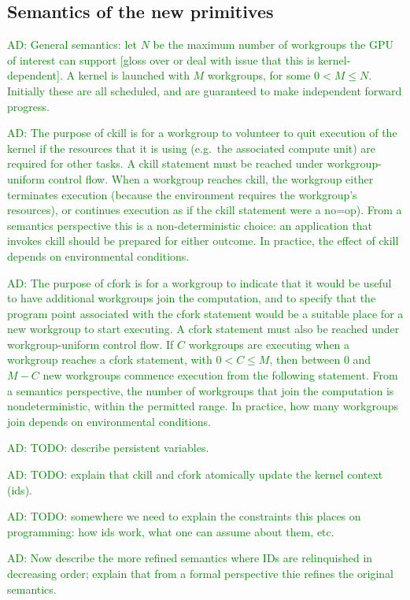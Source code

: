 \documentclass[nocopyrightspace]{sigplanconf-pldi16}
\newcommand{\ADComment}[1]{\textcolor{green}{AD: #1}}
\begin{document}
\subsection{Semantics of the new primitives}

\ADComment{General semantics: let $N$ be the maximum number of
  workgroups the GPU of interest can support [gloss over or deal with
    issue that this is kernel-dependent].  A kernel is launched with
  $M$ workgroups, for some $0 < M \leq N$.  Initially these are all
  scheduled, and are guaranteed to make independent forward progress.}

\ADComment{The purpose of ckill is for a workgroup to volunteer to
  quit execution of the kernel if the resources that it is using
  (e.g.\ the associated compute unit) are required for other tasks.  A
  ckill statement must be reached under workgroup-uniform control
  flow.  When a workgroup reaches ckill, the workgroup either
  terminates execution (because the environment requires the
  workgroup's resources), or continues execution as if the ckill
  statement were a no=op).  From a semantics perspective this is a
  non-deterministic choice: an application that invokes ckill should
  be prepared for either outcome.  In practice, the effect of ckill
  depends on environmental conditions.}

\ADComment{The purpose of cfork is for a workgroup to indicate that it
  would be useful to have additional workgroups join the computation,
  and to specify that the program point associated with the cfork
  statement would be a suitable place for a new workgroup to start
  executing.  A cfork statement must also be reached under
  workgroup-uniform control flow.  If $C$ workgroups are executing
  when a workgroup reaches a cfork statement, with $0 < C \leq M$,
  then between 0 and $M-C$ new workgroups commence execution from the
  following statement.  From a semantics perspective, the number of
  workgroups that join the computation is nondeterministic, within the
  permitted range.  In practice, how many workgroups join depends on
  environmental conditions.}

\ADComment{TODO: describe persistent variables.}

\ADComment{TODO: explain that ckill and cfork atomically update the
  kernel context (ids).}

\ADComment{TODO: somewhere we need to explain the constraints this
  places on programming: how ids work, what one can assume about them,
  etc.}

\ADComment{Now describe the more refined semantics where IDs are
  relinquished in decreasing order; explain that from a formal
  perspective thie refines the original semantics.}
\end{document}
